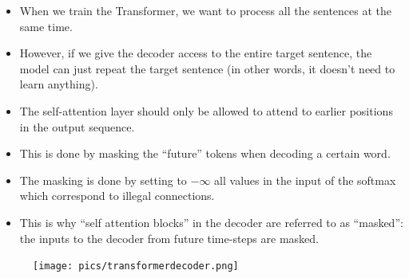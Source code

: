\begin{itemize}
 \item When we train the Transformer, we want to process all the sentences at the same time. 
 
 \item However, if we give the decoder access to the entire target sentence, the model can just repeat the target sentence (in other words, it doesn't need to learn anything).
 
 \item The self-attention layer should only be allowed to attend to earlier positions in the output sequence.
 
 \item This is done by masking the ``future'' tokens when decoding a certain word.

  \item The masking is done by setting to $- \infty$ all values in the input of the softmax which correspond to illegal connections.
 \item This is why ``self attention blocks'' in the decoder are referred to as ``masked'': the inputs to the decoder from future time-steps are masked.
 
 
\end{itemize}

     \begin{figure}[h]
        	\texttt{[image: pics/transformerdecoder.png]}
        \end{figure}  



